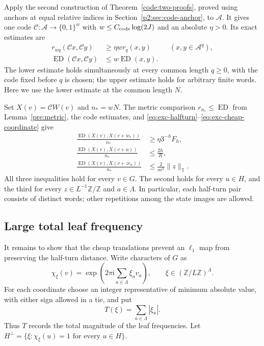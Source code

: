 Apply the second construction of Theorem~\ref{code:two-proofs}, proved
using anchors at equal relative indices in Section~\ref{p2:sec:code-anchor}, to
$\mathcal A$.  It gives one code
$\mathcal C:\mathcal A\to\{0,1\}^{w}$ with
$w\le C_{\rm code}\log(2J)$ and an absolute $\eta>0$.  Its exact estimates
are
\begin{equation}\label{eq:exc-code-interface}
 \begin{aligned}
 r_{wq}(\mathcal Cx,\mathcal Cy)&\ge\eta w r_q(x,y)
       &&(x,y\in\mathcal A^q),\\
 \operatorname{ED}(\mathcal Cx,\mathcal Cy)
       &\le w\operatorname{ED}(x,y).
 \end{aligned}
\end{equation}
The lower estimate holds simultaneously at every common length $q\ge0$,
with the code fixed before $q$ is chosen; the upper estimate holds for
arbitrary finite words.  Here we use the lower estimate at the common
length $N$.

Set $X(v)=\mathcal C W(v)$ and $n_*=wN$.  The metric comparison
$r_{n_*}\le\operatorname{ED}$ from Lemma~\ref{pre:metric}, the code
estimates, and \eqref{eq:exc-halfturn}--\eqref{eq:exc-cheap-coordinate}
give
\begin{align}
 \frac{\operatorname{ED}(X(v),X(v+w_*))}{n_*}
 &\ge\eta3^{-h}F_h,
 \label{eq:exc-binary-far}\\
 \frac{\operatorname{ED}(X(v),X(v+u))}{n_*}
 &\le\frac{2h}{R},
 \label{eq:exc-binary-subgroup}\\
 \frac{\operatorname{ED}(X(v),X(v+ze_a))}{n_*}
 &\le\frac{2}{m^h}\|z\|_{\mathbb T}.
 \label{eq:exc-binary-coordinate}
\end{align}
All three inequalities hold for every $v\in G$.  The second holds for every
$u\in H$, and the third for every $z\in L^{-1}\mathbb Z/\mathbb Z$ and
$a\in\Lambda$.  In particular, each half-turn pair consists of distinct
words; other repetitions among the state images are allowed.

\subsection{Large total leaf frequency}

It remains to show that the cheap translations prevent an $\ell_1$ map
from preserving the half-turn distance.  Write characters of $G$ as
\[
 \chi_\xi(v)=\exp\!\left(2\pi\mathrm i\sum_{a\in\Lambda}\xi_a v_a\right),
 \qquad
 \xi\in(\mathbb Z/L\mathbb Z)^\Lambda .
\]
For each coordinate choose an integer representative of minimum absolute
value, with either sign allowed in a tie, and put
\begin{equation}\label{eq:exc-frequency-size}
 T(\xi)=\sum_{a\in\Lambda}|\xi_a|.
\end{equation}
Thus $T$ records the total magnitude of the leaf frequencies.  Let
$H^\perp=\{\xi:\chi_\xi(u)=1\text{ for every }u\in H\}$.

